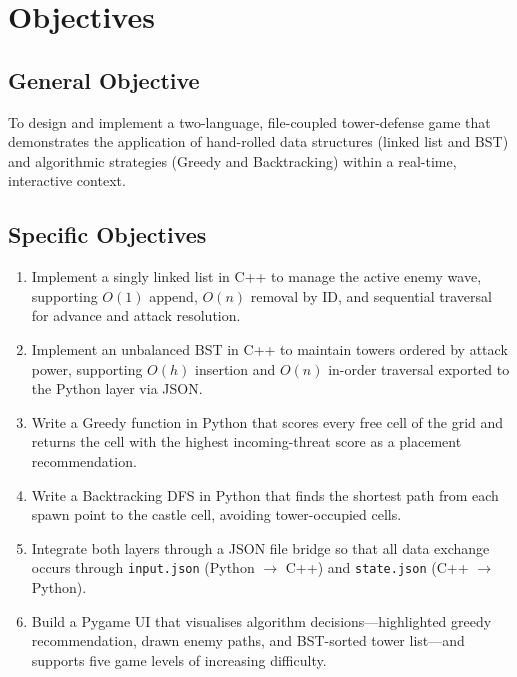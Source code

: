 \documentclass[12pt,a4paper]{report}
\begin{document}
\chapter{Objectives}
\label{ch:objectives}

\section{General Objective}

To design and implement a two-language, file-coupled tower-defense game that
demonstrates the application of hand-rolled data structures (linked list and BST)
and algorithmic strategies (Greedy and Backtracking) within a real-time,
interactive context.

\section{Specific Objectives}

\begin{enumerate}
  \item Implement a singly linked list in C++ to manage the active enemy wave,
        supporting $O(1)$ append, $O(n)$ removal by ID, and sequential
        traversal for advance and attack resolution.
  \item Implement an unbalanced BST in C++ to maintain towers ordered by
        attack power, supporting $O(h)$ insertion and $O(n)$ in-order traversal
        exported to the Python layer via JSON.
  \item Write a Greedy function in Python that scores every free cell of the
        grid and returns the cell with the highest incoming-threat score as a
        placement recommendation.
  \item Write a Backtracking DFS in Python that finds the shortest path from
        each spawn point to the castle cell, avoiding tower-occupied cells.
  \item Integrate both layers through a JSON file bridge so that all data
        exchange occurs through \texttt{input.json} (Python $\to$ C++) and
        \texttt{state.json} (C++ $\to$ Python).
  \item Build a Pygame UI that visualises algorithm decisions---highlighted
        greedy recommendation, drawn enemy paths, and BST-sorted tower
        list---and supports five game levels of increasing difficulty.
\end{enumerate}
\end{document}
